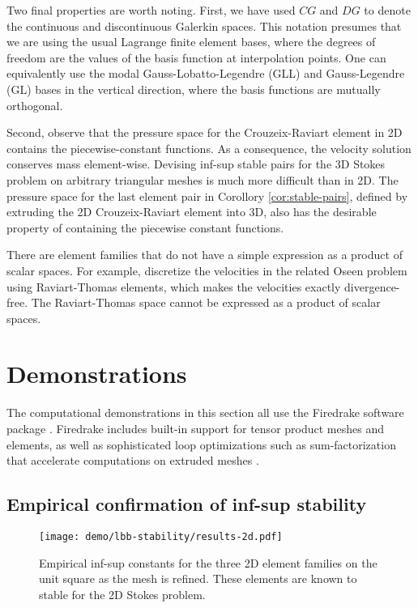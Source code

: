 \documentclass{article}
\theoremstyle{definition}
\theoremstyle{plain}
\begin{document}
Two final properties are worth noting.
First, we have used $CG$ and $DG$ to denote the continuous and discontinuous Galerkin spaces.
This notation presumes that we are using the usual Lagrange finite element bases, where the degrees of freedom are the values of the basis function at interpolation points.
One can equivalently use the modal Gauss-Lobatto-Legendre (GLL) and Gauss-Legendre (GL) bases in the vertical direction, where the basis functions are mutually orthogonal.

Second, observe that the pressure space for the Crouzeix-Raviart element in 2D contains the piecewise-constant functions.
As a consequence, the velocity solution conserves mass element-wise.
Devising inf-sup stable pairs for the 3D Stokes problem on arbitrary triangular meshes is much more difficult than in 2D.
The pressure space for the last element pair in Corollory \ref{cor:stable-pairs}, defined by extruding the 2D Crouzeix-Raviart element into 3D, also has the desirable property of containing the piecewise constant functions.

There are element families that do not have a simple expression as a product of scalar spaces.
For example, \citet{cockburn2007note} discretize the velocities in the related Oseen problem using Raviart-Thomas elements, which makes the velocities exactly divergence-free.
The Raviart-Thomas space cannot be expressed as a product of scalar spaces.



\section{Demonstrations}

The computational demonstrations in this section all use the Firedrake software package \citep{FiredrakeUserManual}.
Firedrake includes built-in support for tensor product meshes and elements, as well as sophisticated loop optimizations such as sum-factorization that accelerate computations on extruded meshes \citep{mcrae2016automated}.

\subsection{Empirical confirmation of inf-sup stability}

\begin{figure}
    \begin{center}
        \texttt{[image: demo/lbb-stability/results-2d.pdf]}
    \end{center}
    \caption{Empirical inf-sup constants for the three 2D element families on the unit square as the mesh is refined.
    These elements are known to stable for the 2D Stokes problem.}
    \label{fig:empirical-lbb-2d}
\end{figure}
\end{document}
